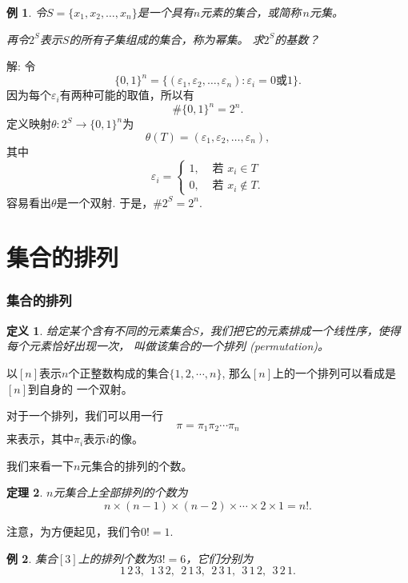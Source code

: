 \documentclass[13pt, punct]{ctexbeamer}
\newtheorem{thm}{定理}[section]
\newtheorem{defi}[thm]{定义}
\newtheorem{ex}{例}[section]
\begin{document}
\begin{frame}
\begin{ex}\label{exa:subset}
	令$S=\{x_1,x_2,\ldots,x_n\}$是一个具有$n$元素的集合，或简称\,\emph{$n$元集}。

	再令$2^S$表示$S$的所有子集组成的集合，称为{幂集}。	求$2^S$的基数？
\end{ex}

\pause
{解:} 令$$\{0,1\}^n=\{(\varepsilon_1,\varepsilon_2,\ldots,\varepsilon_n)
\colon \varepsilon_i=0\mbox{或}1\}.$$
因为每个$\varepsilon_i$有两种可能的取值，所以有$$\#\{0,1\}^n=2^n.$$
定义映射$\theta \colon 2^S\rightarrow \{0,1\}^n$为
$$\theta(T)=(\varepsilon_1,\varepsilon_2,\ldots,\varepsilon_n),$$
其中
\begin{displaymath}
\varepsilon_i=\left\{ \begin{array}{ll}
1, & \mbox{  若 }x_i\in T  \\
0, & \mbox{  若 }x_i\notin T.
\end{array} \right.
\end{displaymath}
容易看出$\theta$是一个双射. 于是，$\#2^S=2^n$.
\end{frame}



\section{集合的排列}

\begin{frame}\frametitle{集合的排列}
\begin{defi}
	给定某个含有不同的元素集合$S$，我们把它的元素排成一个线性序，使得每个元素恰好出现一次，
	叫做该集合的一个\alert{排列 (permutation)}。
\end{defi}

以$[n]$表示$n$个正整数构成的集合$\{1,2,\cdots,n\}$, 那么$[n]$上的一个排列可以看成是$[n]$到自身的
一个\alert{双射}。

对于一个排列，我们可以用一行
$$\pi=\pi_1\pi_2 \cdots \pi_n$$
来表示，其中$\pi_i$表示$i$的像。
\end{frame}

\begin{frame}
我们来看一下$n$元集合的排列的个数。

\begin{thm}
	$n$元集合上全部排列的个数为
	$$n\times (n-1) \times (n-2)\times \cdots \times 2\times 1=n!.$$
\end{thm}

注意，为方便起见，我们令$0!=1$.

\begin{ex}
集合$[3]$上的排列个数为$3!=6$，它们分别为
	\[ 1\,2\,3,~~ 1\,3\,2,~~2\,1\,3,~~2\,3\,1,~~ 3\,1\,2,~~ 3\,2\,1.\]
\end{ex}
\end{frame}
\end{document}
